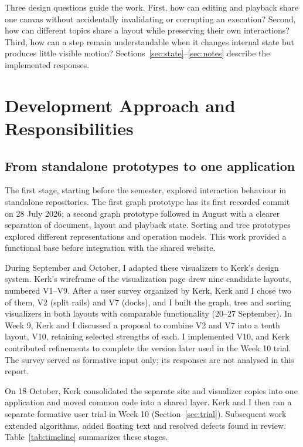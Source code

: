 \documentclass[11pt,a4paper]{article}
\newcommand{\page}{\par\Needspace{5\baselineskip}\vspace{6pt}}
\begin{document}
Three design questions guide the work. First, how can editing and playback share one canvas without accidentally invalidating or corrupting an execution? Second, how can different topics share a layout while preserving their own interactions? Third, how can a step remain understandable when it changes internal state but produces little visible motion? Sections~\ref{sec:state}--\ref{sec:notes} describe the implemented responses.

\page
\section{Development Approach and Responsibilities}\label{sec:approach}
\subsection{From standalone prototypes to one application}
The first stage, starting before the semester, explored interaction behaviour in standalone repositories. The first graph prototype has its first recorded commit on 28 July 2026; a second graph prototype followed in August with a clearer separation of document, layout and playback state. Sorting and tree prototypes explored different representations and operation models. This work provided a functional base before integration with the shared website.

During September and October, I adapted these visualizers to Kerk's design system. Kerk's wireframe of the visualization page drew nine candidate layouts, numbered V1--V9. After a user survey organized by Kerk, Kerk and I chose two of them, V2 (split rails) and V7 (docks), and I built the graph, tree and sorting visualizers in both layouts with comparable functionality (20--27 September). In Week 9, Kerk and I discussed a proposal to combine V2 and V7 into a tenth layout, V10, retaining selected strengths of each. I implemented V10, and Kerk contributed refinements to complete the version later used in the Week 10 trial. The survey served as formative input only; its responses are not analysed in this report.

On 18 October, Kerk consolidated the separate site and visualizer copies into one application and moved common code into a shared layer. Kerk and I then ran a separate formative user trial in Week 10 (Section~\ref{sec:trial}). Subsequent work extended algorithms, added floating text and resolved defects found in review. Table~\ref{tab:timeline} summarizes these stages.
\end{document}
